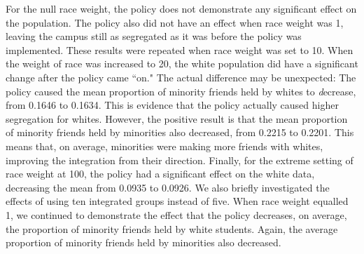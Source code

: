 For the null race weight, the policy does not demonstrate any significant effect on the population. The policy also did not have an effect when race weight was 1, leaving 
the campus still as segregated as it was before the policy was implemented. These results were repeated when race weight was 
set to 10. When the weight of race was increased to 20, the white population did have a significant change after the policy came ``on." The actual difference may 
be unexpected: The policy caused the mean proportion of minority friends held by whites to {\emph decrease}, from 0.1646 to 0.1634. This is evidence that the policy actually caused higher segregation for whites. However, the positive result is that the mean proportion of minority friends held by minorities also decreased, from 0.2215 to 0.2201. This means that, on 
average, minorities were making more friends with whites, improving the integration from their direction. Finally, for the extreme setting of race weight at 100, the policy had a significant effect on the white data, decreasing the mean from 0.0935 to 0.0926. We also briefly investigated the effects of using ten integrated groups instead of five. When race weight equalled 1, we continued to demonstrate the effect that the policy decreases, on average, the proportion of minority friends held by white students. Again, the average proportion of minority friends 
held by minorities also decreased.



